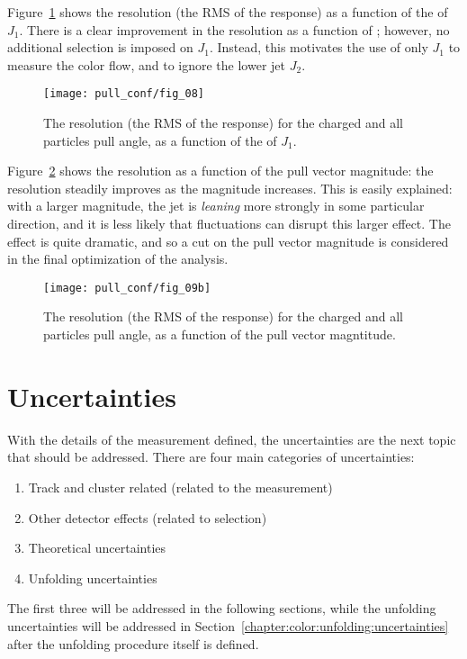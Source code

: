 Figure~\ref{fig:color:resolution:pt} shows the resolution (the RMS of the response) as a function of the \pt of $J_1$. There is a clear improvement in the resolution as a function of \pt; however, no additional selection is imposed on $J_1$. Instead, this motivates the use of only $J_1$ to measure the color flow, and to ignore the lower \pt jet $J_2$.

\begin{figure}[h!]
\begin{center}
\texttt{[image: pull\_conf/fig\_08]}
 \caption{The resolution (the RMS of the response) for the charged and all particles pull angle, as a function of the \pt of $J_1$.}
 \label{fig:color:resolution:pt}
  \end{center}
\end{figure}


Figure~\ref{fig:color:resolution:mag} shows the resolution as a function of the pull vector magnitude: the resolution steadily improves as the magnitude increases. This is easily explained: with a larger magnitude, the jet is \textit{leaning} more strongly in some particular direction, and it is less likely that fluctuations can disrupt this larger effect. The effect is quite dramatic, and so a cut on the pull vector magnitude is considered in the final optimization of the analysis.

\begin{figure}[h!]
\begin{center}
\texttt{[image: pull\_conf/fig\_09b]}
 \caption{The resolution (the RMS of the response) for the charged and all particles pull angle, as a function of the pull vector magntitude.}
 \label{fig:color:resolution:mag}
  \end{center}
\end{figure}


\section{Uncertainties}

With the details of the measurement defined, the uncertainties are the next topic that should be addressed. There are four main categories of uncertainties:
%
\begin{enumerate}
\item Track and cluster related (related to the measurement)
\item Other detector effects (related to selection)
\item Theoretical uncertainties
\item Unfolding uncertainties
\end{enumerate}
%
The first three will be addressed in the following sections, while the unfolding uncertainties will be addressed in Section~\ref{chapter:color:unfolding:uncertainties} after the unfolding procedure itself is defined.


